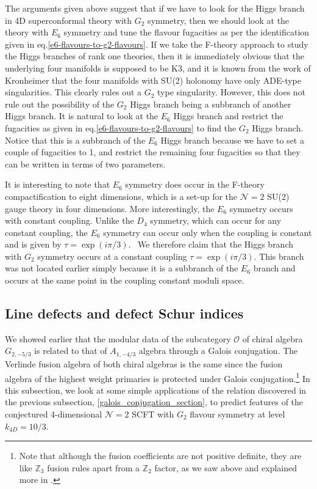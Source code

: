 \documentclass[a4paper,12pt]{article}
\begin{document}
The arguments given above suggest that if we have to look for the Higgs branch in 4D superconformal theory with $G_2$ symmetry, then we should look at the theory with $E_6$ symmetry and tune the flavour fugacities as per the identification given in eq.\eqref{e6-flavours-to-g2-flavours}. If we take the F-theory approach to study the Higgs branches of rank one theories\cite{Sen:1996vd,Dasgupta:1996ij}, then it is immediately obvious that the underlying four manifolds is supposed to be K3, and it is known from the work of Kronheimer\cite{Kronheimer:1989zs} that the four manifolds with SU(2) holonomy have only ADE-type singularities. This clearly rules out a $G_2$ type singularity. However, this does not rule out the possibility of the $G_2$ Higgs branch being a subbranch of another Higgs branch. It is natural to look at the $E_6$ Higgs branch and restrict the fugacities as given in eq.\eqref{e6-flavours-to-g2-flavours} to find the $G_2$ Higgs branch. Notice that this is a subbranch of the $E_6$ Higgs branch because we have to set a couple of fugacities to 1, and restrict the remaining four fugacities so that they can be written in terms of two parameters.

It is interesting to note that $E_6$ symmetry does occur in the F-theory compactification to eight dimensions, which is a set-up for the $\mathcal{N}=2$ SU(2) gauge theory in four dimensions. More interestingly, the $E_6$ symmetry occurs with constant coupling\cite{Dasgupta:1996ij}. Unlike the $D_4$ symmetry, which can occur for any constant coupling\cite{Sen:1996vd}, the $E_6$ symmetry can occur only when the coupling is constant and is given by $\tau = \exp(i\pi/3)$\cite{Dasgupta:1996ij}.  We therefore claim that the Higgs branch with $G_2$ symmetry occurs at a constant coupling $\tau = \exp(i\pi/3)$. This branch was not located earlier simply because it is a subbranch of the $E_6$ branch and occurs at the same point in the coupling constant moduli space.



\subsection{Line defects and defect Schur indices}

We showed earlier that the modular data of the subcategory $\mathcal{O}$ of chiral algebra $G_{2,-5/3}$ is related to that of $A_{1,-4/3}$ algebra through a Galois conjugation. The Verlinde fusion algebra of both chiral algebras is the same since the fusion algebra of the highest weight primaries is protected under Galois conjugation.\footnote{Note that although the fusion coefficients are not positive definite, they are like $\mathbb{Z}_3$ fusion rules apart from a $\mathbb{Z}_2$ factor, as we saw above and explained more in \cite{Buican:2019huq}.} In this subsection, we look at some simple applications of the relation discovered in the previous subsection, \ref{galois_conjugation_section}, to predict features of the conjectured 4-dimensional $\mathcal{N}=2$ SCFT with $G_2$ flavour symmetry at level $k_{4D}=10/3$. 
\end{document}
